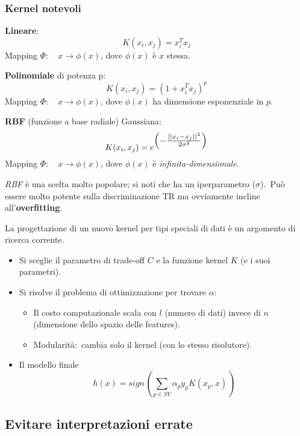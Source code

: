 \subsubsection{Kernel notevoli}

\begin{flushleft}
	\textbf{Lineare}:\[K (x_i, x_j) = x^T_ix_j\]
	Mapping $\Phi:\quad x \rightarrow \phi(x)$, dove $\phi(x)$ è $x$ stessa.
\end{flushleft}

\begin{flushleft}
	\textbf{Polinomiale} di potenza p: \[ K (x_i, x_j) = (1 + x^T_ix_j)^p\]
	Mapping $\Phi:\quad x \rightarrow \phi(x)$, dove $\phi(x)$ ha dimensione esponenziale in $p$.
\end{flushleft}

\begin{flushleft}
	\textbf{RBF} (funzione a base radiale) Gaussiana:\[ K (x_i, x_j) = e^{\scalebox{1.1}{$\left(-\frac{||x_i-x_j||^2}{2\sigma^2}\right)$}}\]
	Mapping $\Phi:\quad x \rightarrow \phi(x)$, dove $\phi(x)$ è \textit{infinita-dimensionale}.
\end{flushleft}

\noindent \textit{RBF} è una scelta molto popolare; si noti che ha un iperparametro ($\sigma$).\
Può essere molto potente sulla discriminazione TR ma ovviamente incline all'\textbf{overfitting}.\

La progettazione di un nuovo kernel per tipi speciali di dati è un argomento di ricerca corrente.

\begin{itemize}
	\item Si sceglie il parametro di trade-off $C$ e la funzione kernel $K$ (e i suoi parametri).
	\item Si risolve il problema di ottimizzazione per trovare $\alpha$:
	      \begin{itemize}
		      \item Il costo computazionale scala con $l$ (numero di dati) invece di $n$ (dimensione dello spazio delle features).
		      \item Modularità:\ cambia solo il kernel (con lo stesso risolutore).
	      \end{itemize}
	\item Il modello finale \[h(x) = \mathit{sign}\left(\sum_{p\in\mathit{SV}}\alpha_py_pK(x_p,x)\right)\]
\end{itemize}

\subsection{Evitare interpretazioni errate}

